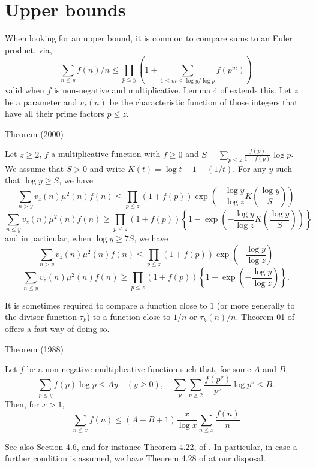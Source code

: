 \section{Upper bounds
}


When looking for an upper bound, it is common to compare sums to an Euler
product, via, 
$$
\sum_{n\le y}f(n)/n\le \prod_{p\le y}
\left(1+\sum_{1\le m\le \log y/\log p}f(p^m)\right)
$$
valid when $f$ is non-negative and multiplicative.
Lemma 4 of
\cite{Daboussi-Rivat*01}
extends this. Let $z$ be a parameter and $v_z(n)$ be the characteristic
function of those integers that have all their prime factors $p\le z$.

\begin{thm}{Theorem (2000)}

Let $z\ge2$, $f$ a multiplicative function with $f\ge0$ and 
$S=\sum_{p\le z}\frac{f(p)}{1+f(p)}\log p$. We assume that $S>0$ and write
$K(t)=\log t-1-(1/t)$. For any $y$ such that $\log y\ge S$, we have
$$
\sum_{n > y}v_z(n)\mu^2(n)f(n)
\le \prod_{p\le z}(1+f(p))\exp\left(-\frac{\log y}{\log z}
K\left(\frac{\log y}{S}\right)\right)
$$
$$
\sum_{n \le y}v_z(n)\mu^2(n)f(n)
\ge \prod_{p\le z}(1+f(p))\left\{1-\exp\left(-\frac{\log y}{\log z}
K\left(\frac{\log y}{S}\right)\right)\right\}
$$
and in particular, when $\log y\ge 7S$, we have
$$
\sum_{n > y}v_z(n)\mu^2(n)f(n)
\le \prod_{p\le z}(1+f(p))\exp\left(-\frac{\log y}{\log z}\right)
$$
$$
\sum_{n \le y}v_z(n)\mu^2(n)f(n)
\ge \prod_{p\le z}(1+f(p))\left\{1-\exp\left(-\frac{\log y}{\log z}\right)\right\}.
$$
\end{thm}


It is sometimes required to compare a function close to $1$ (or more generally
to the divisor
function $\tau_k$) to a function 
close to $1/n$ or $\tau_k(n)/n$. Theorem 01 of 
\cite{Hall-Tenenbaum*88} offers a
fast way of doing so.

\begin{thm}{Theorem (1988)}

Let $f$ be a non-negative multiplicative function such that, for some $A$ and
$B$,
$$
\sum_{p\le y} f(p)\log p\le Ay \quad(y\ge 0),\quad
\sum_p\sum_{\nu\ge2} \frac{f(p^\nu)}{p^\nu}\log p^{\nu}\le B.
$$
Then, for $x > 1$,
$$
\sum_{n\le x}f(n)\le (A+B+1)\frac{x}{\log x}\sum_{n\le x}\frac{f(n)}{n}
$$
\end{thm}

See also Section 4.6, and for instance Theorem 4.22, of
\cite{Bordelles*12}.
In particular,
in case a further condition is assumed, we have Theorem 4.28 of
\cite{Bordelles*12}
at our disposal.

